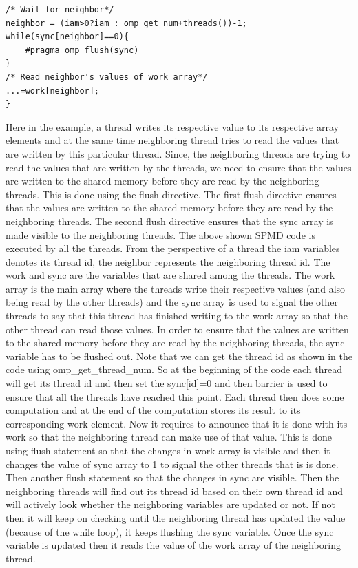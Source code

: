 \documentclass[12pt]{article}
\begin{document}
\begin{itemize}
\begin{lstlisting}[caption={Flush Directive},captionpos=b,label={lst:flush}]
/* Wait for neighbor*/
neighbor = (iam>0?iam : omp_get_num+threads())-1;
while(sync[neighbor]==0){
    #pragma omp flush(sync)
}
/* Read neighbor's values of work array*/
...=work[neighbor];
}
\end{lstlisting}
    Here in the example, a thread writes its respective value to its respective array elements and at the same time 
    neighboring thread tries to read the values that are written by this particular thread. Since, the neighboring threads are trying to read the values that are written by the threads, we need to ensure that the values are written to the shared memory before they are read by the neighboring threads.
    This is done using the flush directive. The first flush directive ensures that the values are written to the shared memory before they are read by the neighboring threads. The second flush directive ensures that the sync array is made visible to the neighboring threads.
    The above shown SPMD code is executed by all the threads. From the perspective of a thread the iam variables denotes its thread id, the neighbor represents the neighboring thread id. The 
    work and sync are the variables that are shared among the threads. The work array is the main array where the threads write their respective values (and also being read by the other threads) and the sync array is used to signal the other threads to say that this thread has finished writing to the work array
    so that the other thread can read those values. In order to ensure that the values are written to the shared memory before they are read by the neighboring threads, the sync variable has to be flushed out.
    Note that we can get the thread id as shown in the code using omp\_get\_thread\_num. So at the beginning of the code each thread will get its thread id and then set the sync[id]=0 and then barrier is used to ensure that all the threads have reached this point.
    Each thread then does some computation and at the end of the computation stores its result to its corresponding work element. Now it requires to announce that it is done with its work so that the neighboring thread can make use of that value.
    This is done using flush statement so that the changes in work array is visible and then it changes the value of sync array to 1 to signal the other threads that is is done. Then another flush statement so that the changes in sync are visible.
    Then the neighboring threads will find out its thread id based on their own thread id and will actively look whether the neighboring variables are updated or not. If not then it will keep on checking until the neighboring thread has updated the value  (because of the while loop),
    it keeps flushing the sync variable. Once the sync variable is updated then it reads the value of the work array of the neighboring thread.
\end{itemize}
\end{document}
